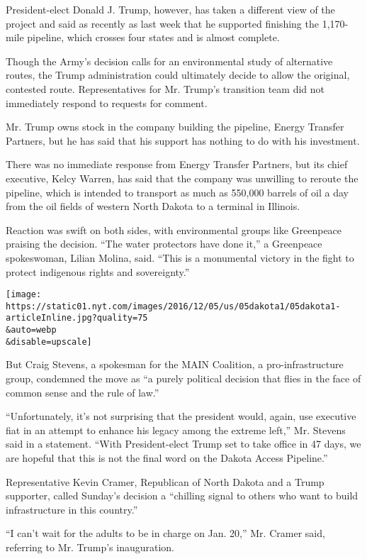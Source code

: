 President-elect Donald J. Trump, however, has taken a different view of
the project and said as recently as last week that he supported
finishing the 1,170-mile pipeline, which crosses four states and is
almost complete.

Though the Army's decision calls for an environmental study of
alternative routes, the Trump administration could ultimately decide to
allow the original, contested route. Representatives for Mr. Trump's
transition team did not immediately respond to requests for comment.

Mr. Trump owns stock in the company building the pipeline, Energy
Transfer Partners, but he has said that his support has nothing to do
with his investment.

There was no immediate response from Energy Transfer Partners, but its
chief executive, Kelcy Warren, has said that the company was unwilling
to reroute the pipeline, which is intended to transport as much as
550,000 barrels of oil a day from the oil fields of western North Dakota
to a terminal in Illinois.

Reaction was swift on both sides, with environmental groups like
Greenpeace praising the decision. ``The water protectors have done it,''
a Greenpeace spokeswoman, Lilian Molina, said. ``This is a monumental
victory in the fight to protect indigenous rights and sovereignty.''

\texttt{[image: https://static01.nyt.com/images/2016/12/05/us/05dakota1/05dakota1-articleInline.jpg?quality=75\\\&auto=webp\\\&disable=upscale]}

But Craig Stevens, a spokesman for the MAIN Coalition, a
pro-infrastructure group, condemned the move as ``a purely political
decision that flies in the face of common sense and the rule of law.''

``Unfortunately, it's not surprising that the president would, again,
use executive fiat in an attempt to enhance his legacy among the extreme
left,'' Mr. Stevens said in a statement. ``With President-elect Trump
set to take office in 47 days, we are hopeful that this is not the final
word on the Dakota Access Pipeline.''

Representative Kevin Cramer, Republican of North Dakota and a Trump
supporter, called Sunday's decision a ``chilling signal to others who
want to build infrastructure in this country.''

``I can't wait for the adults to be in charge on Jan. 20,'' Mr. Cramer
said, referring to Mr. Trump's inauguration.

